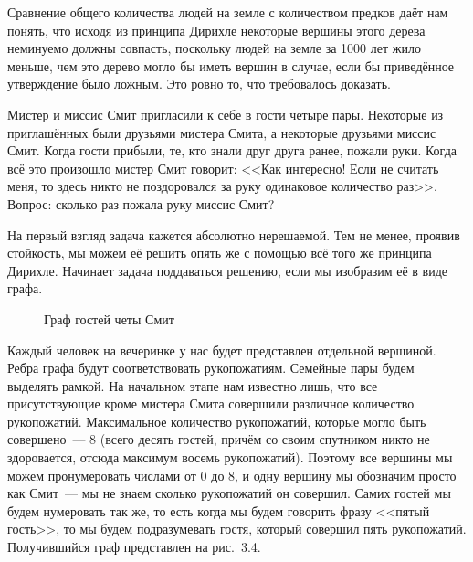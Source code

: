 \begin{example}
Сравнение общего количества людей на земле с количеством предков даёт нам понять, что исходя из принципа Дирихле некоторые вершины этого дерева неминуемо должны совпасть, поскольку людей на земле за 1000 лет жило меньше, чем это дерево могло бы иметь вершин в случае, если бы приведённое утверждение было ложным. Это ровно то, что требовалось доказать.
\end{example}

\begin{example}
Мистер и миссис Смит пригласили к себе в гости четыре пары. Некоторые из приглашённых были друзьями мистера Смита, а некоторые друзьями миссис Смит. Когда гости прибыли, те, кто знали друг друга ранее, пожали руки. Когда всё это произошло мистер Смит говорит: <<Как интересно! Если не считать меня, то здесь никто не поздоровался за руку одинаковое количество раз>>. Вопрос: сколько раз пожала руку миссис Смит?

На первый взгляд задача кажется абсолютно нерешаемой. Тем не менее, проявив стойкость, мы можем её решить опять же с помощью всё того же принципа Дирихле. Начинает задача поддаваться решению, если мы изобразим её в виде графа.

\begin{figure}[h]
\centering
{}
\caption{Граф гостей четы Смит}
\end{figure}

Каждый человек на вечеринке у нас будет представлен отдельной вершиной. Ребра графа будут соответствовать рукопожатиям. Семейные пары будем выделять рамкой. На начальном этапе нам известно лишь, что все присутствующие кроме мистера Смита совершили различное количество рукопожатий. Максимальное количество рукопожатий, которые могло быть совершено~--- 8 (всего десять гостей, причём со своим спутником никто не здоровается, отсюда максимум восемь рукопожатий). Поэтому все вершины мы можем пронумеровать числами от 0 до 8, и одну вершину мы обозначим просто как Смит~--- мы не знаем сколько рукопожатий он совершил. Самих гостей мы будем нумеровать так же, то есть когда мы будем говорить фразу <<пятый гость>>, то мы будем подразумевать гостя, который совершил пять рукопожатий. Получившийся граф представлен на рис.~3.4.


\end{example}
